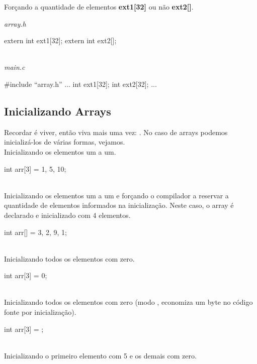 Forçando a quantidade de elementos \textbf{ext1[32]} ou não \textbf{ext2[]}.

\textit{array.h}\\
\begin{ccode}
extern int ext1[32];
extern int ext2[];
\end{ccode}
\\

\textit{main.c}\\
\begin{ccode}
#include ``array.h''
...
int ext1[32];
int ext2[32];
...
\end{ccode}


\subsection{Inicializando Arrays}
Recordar é viver, então viva mais uma vez: . No caso de arrays podemos inicializá-los de várias formas, vejamos.
\\

Inicializando os elementos um a um.

\begin{ccode}
  int arr[3] = {1, 5, 10};
\end{ccode}
\\

Inicializando os elementos um a um e forçando o compilador a reservar a quantidade de elementos informados na inicialização. Neste caso, o array é declarado e inicializado com 4 elementos.

\begin{ccode}
  int arr[] = {3, 2, 9, 1};
\end{ccode}
\\

Inicializando todos os elementos com zero.

\begin{ccode}
  int arr[3] = {0};
\end{ccode}
\\

Inicializando todos os elementos com zero (modo , economiza um byte no código fonte por inicialização).

\begin{ccode}
  int arr[3] = {};
\end{ccode}
\\

Inicializando o primeiro elemento com 5 e os demais com zero.

